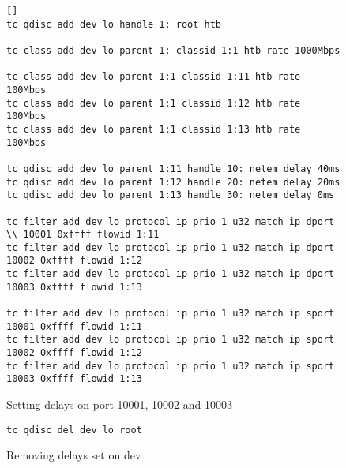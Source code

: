 \begin{figure}[h! ]
\begin{verbatim}[]
tc qdisc add dev lo handle 1: root htb

tc class add dev lo parent 1: classid 1:1 htb rate 1000Mbps

tc class add dev lo parent 1:1 classid 1:11 htb rate 100Mbps
tc class add dev lo parent 1:1 classid 1:12 htb rate 100Mbps
tc class add dev lo parent 1:1 classid 1:13 htb rate 100Mbps

tc qdisc add dev lo parent 1:11 handle 10: netem delay 40ms
tc qdisc add dev lo parent 1:12 handle 20: netem delay 20ms
tc qdisc add dev lo parent 1:13 handle 30: netem delay 0ms

tc filter add dev lo protocol ip prio 1 u32 match ip dport \\ 10001 0xffff flowid 1:11
tc filter add dev lo protocol ip prio 1 u32 match ip dport 10002 0xffff flowid 1:12
tc filter add dev lo protocol ip prio 1 u32 match ip dport 10003 0xffff flowid 1:13

tc filter add dev lo protocol ip prio 1 u32 match ip sport 10001 0xffff flowid 1:11
tc filter add dev lo protocol ip prio 1 u32 match ip sport 10002 0xffff flowid 1:12
tc filter add dev lo protocol ip prio 1 u32 match ip sport 10003 0xffff flowid 1:13
\end{verbatim}
\caption{Setting delays on port 10001, 10002 and 10003}
\end{figure}

\begin{figure}[h!]
\begin{verbatim}
tc qdisc del dev lo root
\end{verbatim}
\caption{Removing delays set on dev}
\end{figure}


